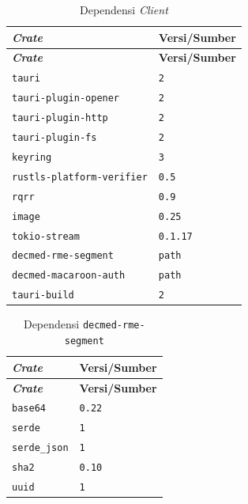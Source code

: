 \documentclass[bahasa, 12pt, a4paper, onecolumn, oneside, final]{report}
\begin{document}
\begin{longtable}{|>{\raggedright\arraybackslash}p{}|>{\raggedright\arraybackslash}p{}|}
	\caption{Dependensi \textit{Client}}
	\label{tab:dependensi-client-tauri}                       \\
	\hline
	\textbf{\textit{Crate}}           & \textbf{Versi/Sumber} \\
	\hline
	\endfirsthead
	\hline
	\textbf{\textit{Crate}}           & \textbf{Versi/Sumber} \\
	\hline
	\endhead

	\texttt{tauri}                    & \texttt{2}            \\ \hline
	\texttt{tauri-plugin-opener}      & \texttt{2}            \\ \hline
	\texttt{tauri-plugin-http}        & \texttt{2}            \\ \hline
	\texttt{tauri-plugin-fs}          & \texttt{2}            \\ \hline
	\texttt{keyring}                  & \texttt{3}            \\ \hline
	\texttt{rustls-platform-verifier} & \texttt{0.5}          \\ \hline
	\texttt{rqrr}                     & \texttt{0.9}          \\ \hline
	\texttt{image}                    & \texttt{0.25}         \\ \hline
	\texttt{tokio-stream}             & \texttt{0.1.17}       \\ \hline
	\texttt{decmed-rme-segment}       & \texttt{path}         \\ \hline
	\texttt{decmed-macaroon-auth}     & \texttt{path}         \\ \hline
	\texttt{tauri-build}              & \texttt{2}            \\ \hline
\end{longtable}

\begin{longtable}{|>{\raggedright\arraybackslash}p{}|>{\raggedright\arraybackslash}p{}|}
	\caption{Dependensi \texttt{decmed-rme-segment}}
	\label{tab:dependensi-decmed-rme-segment}       \\
	\hline
	\textbf{\textit{Crate}} & \textbf{Versi/Sumber} \\
	\hline
	\endfirsthead
	\hline
	\textbf{\textit{Crate}} & \textbf{Versi/Sumber} \\
	\hline
	\endhead

	\texttt{base64}         & \texttt{0.22}         \\ \hline
	\texttt{serde}          & \texttt{1}            \\ \hline
	\texttt{serde\_json}    & \texttt{1}            \\ \hline
	\texttt{sha2}           & \texttt{0.10}         \\ \hline
	\texttt{uuid}           & \texttt{1}            \\ \hline
\end{longtable}
\end{document}
